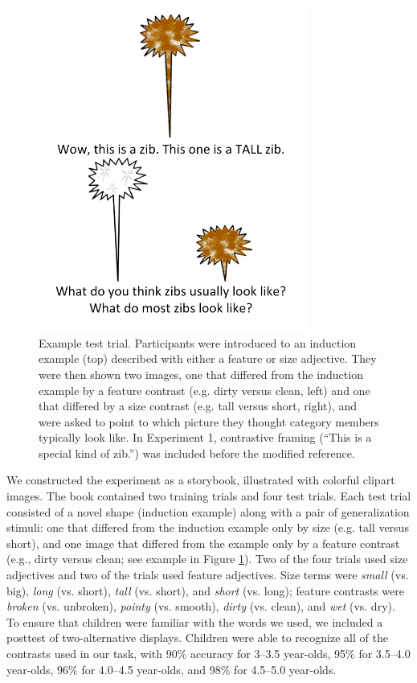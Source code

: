 \documentclass[man]{apa2}
\begin{document}
\begin{figure}[t]
  \begin{center} 
    \includegraphics[width=3.5in]{figures/zib_demo.png} 
    \caption{\label{fig:inanimate_demo} Example test trial. Participants were introduced to an induction example (top) described with either a feature or size adjective. They were then shown two images, one that differed from the induction example by a feature contrast (e.g. dirty versus clean, left) and one that differed by a size contrast (e.g. tall versus short, right), and were asked to point to which picture they thought category members typically look like. In Experiment 1, contrastive framing (``This is a special kind of zib.'') was included before the modified reference. } 
  \end{center} 
\vspace{-10ex}
\end{figure}	

We constructed the experiment as a storybook, illustrated with colorful clipart images. The book contained two training trials and four test trials. Each test trial consisted of a novel shape (induction example) along with a pair of generalization stimuli: one that differed from the induction example only by size (e.g. tall versus short), and one image that differed from the example only by a feature contrast (e.g., dirty versus clean; see example in Figure \ref{fig:inanimate_demo}). Two of the four trials used size adjectives and two of the trials used feature adjectives. Size terms were \emph{small} (vs. big), \emph{long} (vs. short), \emph{tall} (vs. short), and \emph{short} (vs. long);  feature contrasts were \emph{broken} (vs. unbroken), \emph{pointy} (vs. smooth), \emph{dirty} (vs. clean), and \emph{wet} (vs. dry).  To ensure that children were familiar with the words we used, we included a posttest of two-alternative displays.  Children were able to recognize all of the contrasts used in our task, with 90\% accuracy for 3--3.5 year-olds, 95\% for 3.5--4.0 year-olds, 96\% for 4.0--4.5 year-olds, and 98\% for 4.5--5.0 year-olds.  
\end{document}
